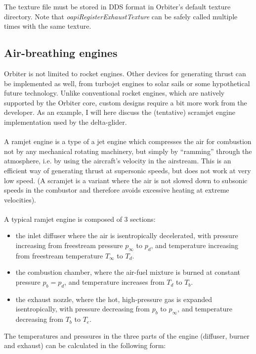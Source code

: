 \documentclass[Orbiter Developer Manual.tex]{subfiles}
\begin{document}
\noindent
The texture file must be stored in DDS format in Orbiter’s default texture directory. Note that \textit{oapiRegisterExhaustTexture} can be safely called multiple times with the same texture.


\subsection{Air-breathing engines}
Orbiter is not limited to rocket engines. Other devices for generating thrust can be implemented as well, from turbojet engines to solar sails or some hypothetical future technology. Unlike conventional rocket engines, which are natively supported by the Orbiter core, custom designs require a bit more work from the developer. As an example, I will here discuss the (tentative) scramjet engine implementation used by the delta-glider.\\
\\
A ramjet engine is a type of a jet engine which compresses the air for combustion not by any mechanical rotating machinery, but simply by “ramming” through the atmosphere, i.e. by using the aircraft’s velocity in the airstream. This is an efficient way of generating thrust at supersonic speeds, but does not work at very low speed. (A scramjet is a variant where the air is not slowed down to subsonic speeds in the combustor and therefore avoids excessive heating at extreme velocities).\\
\\
A typical ramjet engine is composed of 3 sections:

\begin{itemize}
\item the inlet diffuser where the air is isentropically decelerated, with pressure increasing from freestream pressure $p_{\infty}$ to $p_{d}$, and temperature increasing from freestream temperature $T_{\infty}$ to $T_{d}$.
\item the combustion chamber, where the air-fuel mixture is burned at constant pressure $p_{b} = p_{d}$, and temperature increases from $T_{d}$ to $T_{b}$.
\item the exhaust nozzle, where the hot, high-pressure gas is expanded isentropically, with pressure decreasing from $p_{b}$ to $p_{\infty}$, and temperature decreasing from $T_{b}$ to $T_{e}$.
\end{itemize}

\noindent
The temperatures and pressures in the three parts of the engine (diffuser, burner and exhaust) can be calculated in the following form:
\end{document}
